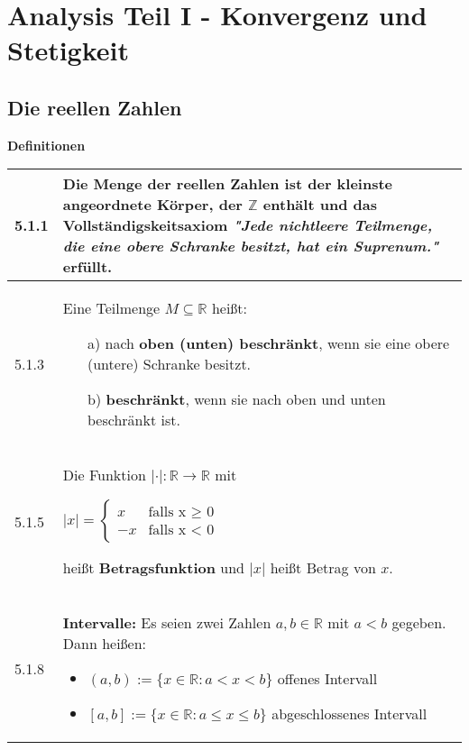 \section{Analysis Teil I - Konvergenz und Stetigkeit}
\subsection{Die reellen Zahlen}
    \noindent
    \textbf{Definitionen} 
    \begin{table}[H]  
    \begin{tabularx}{\textwidth}{X m{16cm}}
        \toprule
        
        5.1.1 & Die \textbf{Menge der reellen Zahlen} ist der kleinste angeordnete Körper, 
                der $\mathbb{Z}$ enthält und das Vollständigskeitsaxiom 
                \textit{"Jede nichtleere Teilmenge, die eine obere Schranke besitzt, hat ein Suprenum."}
                erfüllt. \\
        \midrule
        5.1.3 & Eine Teilmenge $M \subseteq \mathbb{R}$ heißt:
                \begin{itemize}[topsep=-0.5cm]
                    \item[a)] nach \textbf{oben (unten) beschränkt}, wenn sie eine obere (untere) Schranke besitzt.
                    \item[b)] \textbf{beschränkt}, wenn sie nach oben und unten beschränkt ist. 
                \end{itemize} \vspace{-0cm} \\
        \midrule
        5.1.5 & Die Funktion $|\cdot|: \mathbb{R} \rightarrow \mathbb{R}$ mit \hfill \break
                \centerline{    
                    $|x| =  \begin{cases}
                    x & \text{falls x $\geq$ 0} \\
                    -x & \text{falls x < 0}
                \end{cases}$
                } \hfill \break
                heißt \textbf{Betragsfunktion} und $|x|$ heißt Betrag von $x$. \\
        \midrule
        5.1.8 & \textbf{Intervalle:} \hfill \break 
                Es seien zwei Zahlen $a,b \in \mathbb{R}$ mit $a < b$ gegeben. Dann heißen:
                \begin{itemize}[topsep=-0.5cm]
                    \item $(a,b):= \{x \in \mathbb{R}: a < x < b\}$ offenes Intervall
                    \item $[a,b]:= \{x \in \mathbb{R}: a \leq x \leq b\}$ abgeschlossenes Intervall

\end{itemize}
\end{tabularx}
\end{table}
